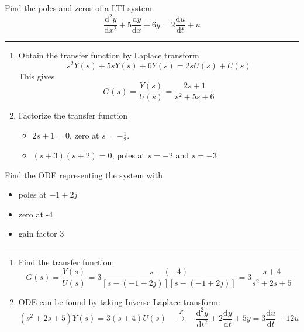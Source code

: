 \begin{ex}{}
Find the poles and zeros of a LTI system
    \[\frac{\mathrm{d}^{2}y}{\mathrm{d}x^{2}}+5\frac{\mathrm{d}y}{\mathrm{d}x}+6y = 2\frac{\mathrm{d}u}{\mathrm{d}t}+u\]
\hrule
\vspace{.3cm}
\begin{enumerate}
    \item Obtain the transfer function by Laplace transform
        \[s^{2}Y(s)+5sY(s)+6Y(s) = 2sU(s)+U(s)\]
        This gives
        \[G(s) =\frac{Y(s)}{U(s)} = \frac{2s+1}{s^{2}+5s+6}\]
        
    \item Factorize the transfer function
        \begin{itemize}
            \item $2s+1=0$, zero at $s = -\frac{1}{2}$.
            \item $(s+3)(s+2)=0$, poles at $s = -2$ and $s = -3$
        \end{itemize}
\end{enumerate}
\end{ex}
\begin{ex}{}
Find the ODE representing the system with 
\begin{itemize}
    \item poles at $-1\pm 2j$
    \item zero at -4 
    \item gain factor 3
\end{itemize}
\hrule
\vspace{.3cm}
\begin{enumerate}
    \item Find the transfer function:
    \[
    G(s) = \frac{Y(s)}{U(s)} 
    = 3\frac{s-(-4)}{[s-(-1-2j)][s-(-1+2j)]} 
    = 3\frac{s+4}{s^{2}+2s+5}
    \]
    
    \item ODE can be found by taking Inverse Laplace transform:
    \[
    (s^{2}+2s+5)Y(s) = 3(s+4)U(s)
    \quad \xrightarrow{\mathcal{L}} \quad
    \frac{\mathrm{d}^{2}y}{\mathrm{d}t^{2}}+2\frac{\mathrm{d}y}{\mathrm{d}t}+5y 
    = 3\frac{\mathrm{d}u}{\mathrm{d}t}+12u 
    \]
\end{enumerate}
\end{ex}


